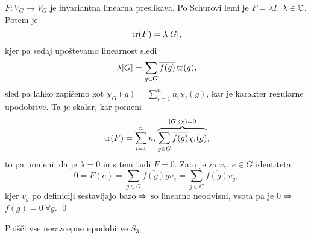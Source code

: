 $F : V_G \to V_G$ je invariantna linearna preslikava. Po Schurovi lemi je $F = \lambda I$, $\lambda \in \mathbb{C}$. Potem je
\[
	\operatorname{tr}(F) = \lambda|G|,
\]
kjer pa sedaj upo\v stevamo linearnost sledi
\[
	\lambda|G| = \sum_{g \in G}\overline{f(g)}\operatorname{tr}(g),
\]
sled pa lahko zapi\v semo kot $\chi_G(g) = \sum_{i = 1}^n n_i \chi_i(g)$, kar je karakter regularne upodobitve. Ta je skalar, kar
pomeni
\[
	\operatorname{tr}(F) = \sum_{i = 1}^n n_i \overbrace{\sum_{g \in G} \overline{f(g)}\chi_i(g)}^{|G|\langle \chi \rangle = 0},
\]
to pa pomeni, da je $\lambda = 0$ in s tem tudi $F = 0$. Zato je za $v_e$, $e \in G$ identiteta:
\[
	0 = F(e) = \sum_{g \in G} \overline{f(g)}gv_e = \sum_{g \in G} \overline{f(g)}v_g,
\]
kjer $v_g$ po definiciji sestavljajo bazo $\Rightarrow$ so linearno neodvisni, vsota pa je $0$ $\Rightarrow$ $f(g) = 0\ \forall g$.
\qed

\begin{zgled}
	Poi\v s\v ci vse nerazcepne upodobitve $S_3$.

\end{zgled}
